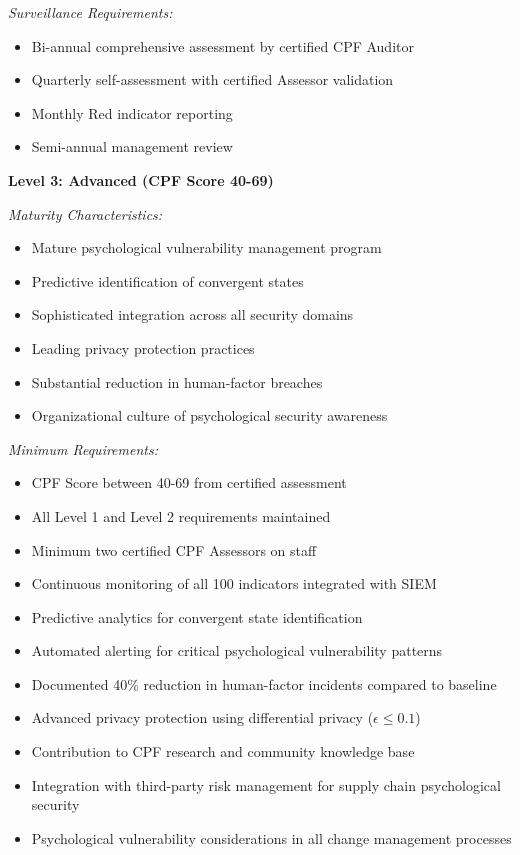 \documentclass[11pt,a4paper]{article}
\begin{document}
\textit{Surveillance Requirements:}
\begin{itemize}
\item Bi-annual comprehensive assessment by certified CPF Auditor
\item Quarterly self-assessment with certified Assessor validation
\item Monthly Red indicator reporting
\item Semi-annual management review
\end{itemize}

\textbf{Level 3: Advanced (CPF Score 40-69)}

\textit{Maturity Characteristics:}
\begin{itemize}
\item Mature psychological vulnerability management program
\item Predictive identification of convergent states
\item Sophisticated integration across all security domains
\item Leading privacy protection practices
\item Substantial reduction in human-factor breaches
\item Organizational culture of psychological security awareness
\end{itemize}

\textit{Minimum Requirements:}
\begin{itemize}
\item CPF Score between 40-69 from certified assessment
\item All Level 1 and Level 2 requirements maintained
\item Minimum two certified CPF Assessors on staff
\item Continuous monitoring of all 100 indicators integrated with SIEM
\item Predictive analytics for convergent state identification
\item Automated alerting for critical psychological vulnerability patterns
\item Documented 40\% reduction in human-factor incidents compared to baseline
\item Advanced privacy protection using differential privacy ($\epsilon \leq 0.1$)
\item Contribution to CPF research and community knowledge base
\item Integration with third-party risk management for supply chain psychological security
\item Psychological vulnerability considerations in all change management processes
\end{itemize}
\end{document}

